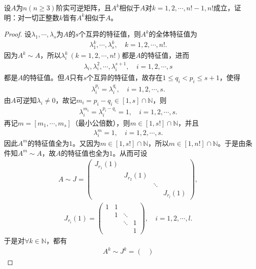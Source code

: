 \documentclass[../../main.tex]{subfiles}
\begin{document}
\begin{example}
设$A$为$n(n \geqslant 3)$阶实可逆矩阵，且$A^k$相似于$A$对$k = 1,2,\cdots,n!-1,n!$成立，证明：对一切正整数$k$皆有$A^k$相似于$A$。
\end{example}
\begin{proof}
设$\lambda_1,\cdots,\lambda_s$为$A$的$s$个互异的特征值，则$A^k$的全体特征值为
\begin{align*}
\lambda_1^k,\cdots,\lambda_s^k,\quad k=1,2,\cdots,n!.
\end{align*}
因为$A^k\sim A$，所以$\lambda_i^k\ (k=1,2,\cdots,n!)$都是$A$的特征值，进而
\begin{align*}
\lambda_i,\lambda_i^2,\cdots,\lambda_i^{s+1},\quad i=1,2,\cdots,s
\end{align*}
都是$A$的特征值。但$A$只有$s$个互异的特征值，故存在$1\leqslant q_i<p_i\leqslant s+1$，使得
\begin{align*}
\lambda_i^{p_i}=\lambda_i^{q_i},\quad i=1,2,\cdots,s.
\end{align*}
由$A$可逆知$\lambda_i\ne 0$，故记$m_i=p_i-q_i\in [1,s]\cap\mathbb{N}$，则
\begin{align*}
\lambda_i^{m_i}=\lambda_i^{p_i-q_i}=1,\quad i=1,2,\cdots,s.
\end{align*}
再记$m=[m_1,\cdots,m_s]$（最小公倍数），则$m\in [1,s!]\cap\mathbb{N}$，并且
\begin{align*}
\lambda_i^m=1,\quad i=1,2,\cdots,s.
\end{align*}
因此$A^m$的特征值全为$1$。又因为$m\in [1,s!]\cap\mathbb{N}$，所以$m\in [1,n!]\cap\mathbb{N}$。于是由条件知$A^m\sim A$，故$A$的特征值也全为$1$。从而可设
\begin{align*}
A\sim J=\begin{pmatrix}
J_{r_1}(1) & & & \\
& J_{r_2}(1) & & \\
& & \ddots & \\
& & & J_{r_l}(1)
\end{pmatrix},
\end{align*}
\begin{align*}
J_{r_i}(1)=\begin{pmatrix}
1 & 1 & & \\
& 1 & \ddots & \\
& & \ddots & 1 \\
& & & 1
\end{pmatrix},\quad i=1,2,\cdots,l.
\end{align*}
于是对$\forall k\in\mathbb{N}$，都有
\begin{align*}
A^k\sim J^k=\begin{pmatrix}

\end{pmatrix}
\end{align*}
\end{proof}
\end{document}
